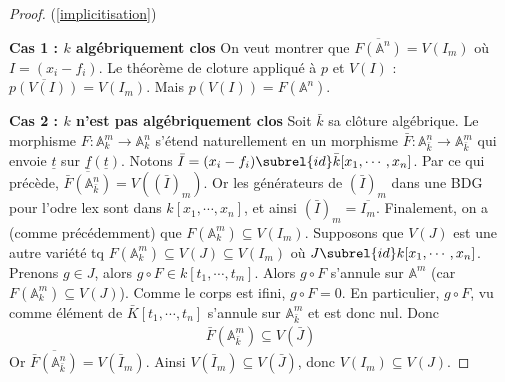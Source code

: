         \begin{proof} (\ref{implicitisation})
            \item \textbf{Cas 1 : $k$ algébriquement clos} On veut montrer que $\overline{F(\mathbb{A}^n)} = V(I_m)$ où $I = (x_i - f_i)$. Le théorème de cloture appliqué à $p$ et $V(I)$ : $\overline{p(V(I))} = V(I_m)$. Mais $p(V(I)) = F(\mathbb{A}^n)$.
            \item \textbf{Cas 2 : $k$ n'est pas algébriquement clos} Soit $\bar k$ sa clôture algébrique. Le morphisme $F : \mathbb{A}^m_k \to \mathbb{A}^n_k$ s'étend naturellement en un morphisme $\bar F : \mathbb{A}^n_{\bar k} \to \mathbb{A}^m_{\bar k}$ qui envoie $\underline{t}$ sur $\underline{f}(\underline{t})$. Notons $\bar I = (x_i - f_i) \subrel{id} \bar k[x_1, \cdots, x_n]$. Par ce qui précède, $\overline{\bar F(\mathbb{A}^n_{\bar k})} = V((\bar I)_m)$. Or les générateurs de $(\bar I)_m$ dans une BDG pour l'odre lex sont dans $k[x_1, \cdots, x_n]$, et ainsi $(\bar I)_m = \overline{I_m}$. Finalement, on a (comme précédemment) que $F(\mathbb{A}^m_k) \subseteq V(I_m)$. Supposons que $V(J)$ est une autre variété tq $F(\mathbb{A}^m_k) \subseteq V(J) \subseteq V(I_m)$ où $J \subrel{id} k[x_1, \cdots, x_n]$. Prenons $g \in J$, alors $g \circ F \in k[t_1, \cdots, t_m]$. Alors $g \circ F$ s'annule sur $\mathbb{A}^m$ (car $F(\mathbb{A}^m_k) \subseteq V(J)$). Comme le corps est ifini, $g \circ F = 0$. En particulier, $g \circ F$, vu comme élément de $\bar K[t_1, \cdots, t_n]$ s'annule sur $\mathbb{A}^m_{\bar k}$ et est donc nul. Donc
            \begin{align*}
                \bar F(\mathbb{A}^m_{\bar k}) \subseteq V(\bar J)
            \end{align*}
            Or $\overline{\bar F(\mathbb{A}^n_{\bar k})} = V(\bar I_m)$. Ainsi $V(\bar I_m) \subseteq V(\bar J)$, donc $V(I_m) \subseteq V(J)$.
        \end{proof}
